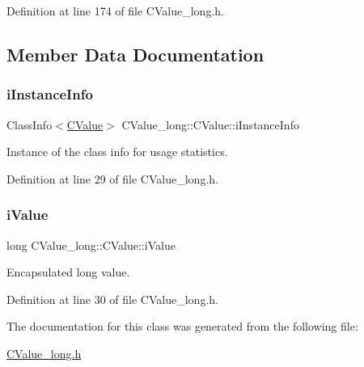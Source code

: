 Definition at line 174 of file C\+Value\+\_\+long.\+h.



\subsection{Member Data Documentation}
\mbox{\label{class_c_value__long_1_1_c_value_a8fe601f5ab7c00ed6438775489b1b139}} 
\subsubsection{\texorpdfstring{i\+Instance\+Info}{iInstanceInfo}}
{\footnotesize\ttfamily Class\+Info$<$\hyperlink{class_c_value__long_1_1_c_value}{C\+Value}$>$ C\+Value\+\_\+long\+::\+C\+Value\+::i\+Instance\+Info\hspace{0.3cm}{\ttfamily [private]}}



Instance of the class info for usage statistics. 



Definition at line 29 of file C\+Value\+\_\+long.\+h.

\mbox{\label{class_c_value__long_1_1_c_value_a64fa282dcd9e69e0cf70ed07c5558d11}} 
\subsubsection{\texorpdfstring{i\+Value}{iValue}}
{\footnotesize\ttfamily long C\+Value\+\_\+long\+::\+C\+Value\+::i\+Value\hspace{0.3cm}{\ttfamily [private]}}



Encapsulated {\ttfamily long} value. 



Definition at line 30 of file C\+Value\+\_\+long.\+h.



The documentation for this class was generated from the following file\+:\begin{DoxyCompactItemize}
\item 
\hyperlink{_c_value__long_8h}{C\+Value\+\_\+long.\+h}\end{DoxyCompactItemize}
